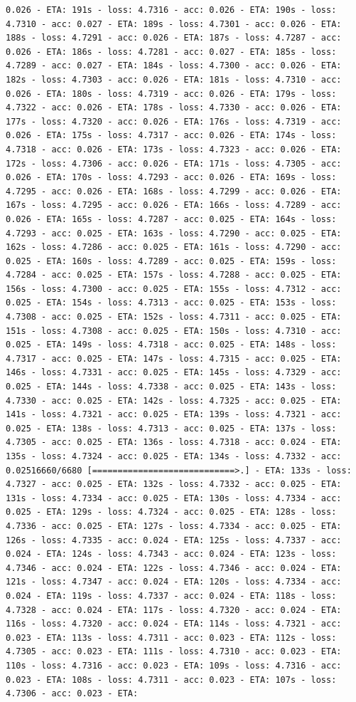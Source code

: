 \documentclass[11pt]{article}
\begin{document}
\begin{Verbatim}[commandchars=\\\{\}]
0.026 - ETA: 191s - loss: 4.7316 - acc: 0.026 - ETA: 190s - loss: 4.7310 - acc: 0.027 - ETA: 189s - loss: 4.7301 - acc: 0.026 - ETA: 188s - loss: 4.7291 - acc: 0.026 - ETA: 187s - loss: 4.7287 - acc: 0.026 - ETA: 186s - loss: 4.7281 - acc: 0.027 - ETA: 185s - loss: 4.7289 - acc: 0.027 - ETA: 184s - loss: 4.7300 - acc: 0.026 - ETA: 182s - loss: 4.7303 - acc: 0.026 - ETA: 181s - loss: 4.7310 - acc: 0.026 - ETA: 180s - loss: 4.7319 - acc: 0.026 - ETA: 179s - loss: 4.7322 - acc: 0.026 - ETA: 178s - loss: 4.7330 - acc: 0.026 - ETA: 177s - loss: 4.7320 - acc: 0.026 - ETA: 176s - loss: 4.7319 - acc: 0.026 - ETA: 175s - loss: 4.7317 - acc: 0.026 - ETA: 174s - loss: 4.7318 - acc: 0.026 - ETA: 173s - loss: 4.7323 - acc: 0.026 - ETA: 172s - loss: 4.7306 - acc: 0.026 - ETA: 171s - loss: 4.7305 - acc: 0.026 - ETA: 170s - loss: 4.7293 - acc: 0.026 - ETA: 169s - loss: 4.7295 - acc: 0.026 - ETA: 168s - loss: 4.7299 - acc: 0.026 - ETA: 167s - loss: 4.7295 - acc: 0.026 - ETA: 166s - loss: 4.7289 - acc: 0.026 - ETA: 165s - loss: 4.7287 - acc: 0.025 - ETA: 164s - loss: 4.7293 - acc: 0.025 - ETA: 163s - loss: 4.7290 - acc: 0.025 - ETA: 162s - loss: 4.7286 - acc: 0.025 - ETA: 161s - loss: 4.7290 - acc: 0.025 - ETA: 160s - loss: 4.7289 - acc: 0.025 - ETA: 159s - loss: 4.7284 - acc: 0.025 - ETA: 157s - loss: 4.7288 - acc: 0.025 - ETA: 156s - loss: 4.7300 - acc: 0.025 - ETA: 155s - loss: 4.7312 - acc: 0.025 - ETA: 154s - loss: 4.7313 - acc: 0.025 - ETA: 153s - loss: 4.7308 - acc: 0.025 - ETA: 152s - loss: 4.7311 - acc: 0.025 - ETA: 151s - loss: 4.7308 - acc: 0.025 - ETA: 150s - loss: 4.7310 - acc: 0.025 - ETA: 149s - loss: 4.7318 - acc: 0.025 - ETA: 148s - loss: 4.7317 - acc: 0.025 - ETA: 147s - loss: 4.7315 - acc: 0.025 - ETA: 146s - loss: 4.7331 - acc: 0.025 - ETA: 145s - loss: 4.7329 - acc: 0.025 - ETA: 144s - loss: 4.7338 - acc: 0.025 - ETA: 143s - loss: 4.7330 - acc: 0.025 - ETA: 142s - loss: 4.7325 - acc: 0.025 - ETA: 141s - loss: 4.7321 - acc: 0.025 - ETA: 139s - loss: 4.7321 - acc: 0.025 - ETA: 138s - loss: 4.7313 - acc: 0.025 - ETA: 137s - loss: 4.7305 - acc: 0.025 - ETA: 136s - loss: 4.7318 - acc: 0.024 - ETA: 135s - loss: 4.7324 - acc: 0.025 - ETA: 134s - loss: 4.7332 - acc: 0.02516660/6680 [============================>.] - ETA: 133s - loss: 4.7327 - acc: 0.025 - ETA: 132s - loss: 4.7332 - acc: 0.025 - ETA: 131s - loss: 4.7334 - acc: 0.025 - ETA: 130s - loss: 4.7334 - acc: 0.025 - ETA: 129s - loss: 4.7324 - acc: 0.025 - ETA: 128s - loss: 4.7336 - acc: 0.025 - ETA: 127s - loss: 4.7334 - acc: 0.025 - ETA: 126s - loss: 4.7335 - acc: 0.024 - ETA: 125s - loss: 4.7337 - acc: 0.024 - ETA: 124s - loss: 4.7343 - acc: 0.024 - ETA: 123s - loss: 4.7346 - acc: 0.024 - ETA: 122s - loss: 4.7346 - acc: 0.024 - ETA: 121s - loss: 4.7347 - acc: 0.024 - ETA: 120s - loss: 4.7334 - acc: 0.024 - ETA: 119s - loss: 4.7337 - acc: 0.024 - ETA: 118s - loss: 4.7328 - acc: 0.024 - ETA: 117s - loss: 4.7320 - acc: 0.024 - ETA: 116s - loss: 4.7320 - acc: 0.024 - ETA: 114s - loss: 4.7321 - acc: 0.023 - ETA: 113s - loss: 4.7311 - acc: 0.023 - ETA: 112s - loss: 4.7305 - acc: 0.023 - ETA: 111s - loss: 4.7310 - acc: 0.023 - ETA: 110s - loss: 4.7316 - acc: 0.023 - ETA: 109s - loss: 4.7316 - acc: 0.023 - ETA: 108s - loss: 4.7311 - acc: 0.023 - ETA: 107s - loss: 4.7306 - acc: 0.023 - ETA: 
\end{Verbatim}
\end{document}
